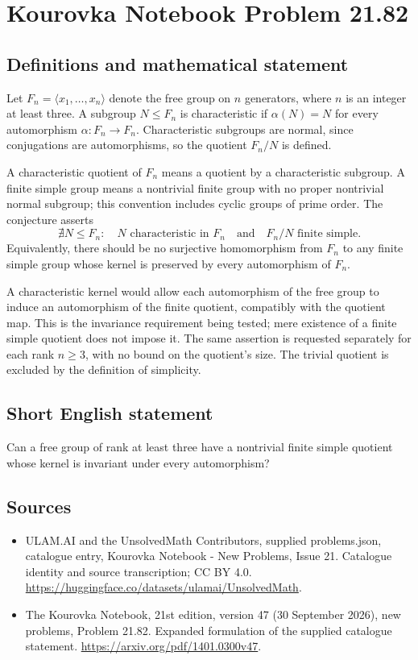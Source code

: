\documentclass[11pt,a4paper]{article}
\begin{document}
\section*{Kourovka Notebook Problem 21.82}\label{statement}

\subsection{Definitions and mathematical statement}
Let $F_n=\langle x_1,\ldots,x_n\rangle$ denote the free group on $n$ generators, where $n$ is an integer at least three. A subgroup $N\le F_n$ is characteristic if $\alpha(N)=N$ for every automorphism $\alpha:F_n\to F_n$. Characteristic subgroups are normal, since conjugations are automorphisms, so the quotient $F_n/N$ is defined.

A characteristic quotient of $F_n$ means a quotient by a characteristic subgroup. A finite simple group means a nontrivial finite group with no proper nontrivial normal subgroup; this convention includes cyclic groups of prime order. The conjecture asserts
\[
 \nexists N\le F_n:\quad
 N\text{ characteristic in }F_n
 \quad\text{and}\quad F_n/N\text{ finite simple}.
\]
Equivalently, there should be no surjective homomorphism from $F_n$ to any finite simple group whose kernel is preserved by every automorphism of $F_n$.

A characteristic kernel would allow each automorphism of the free group to induce an automorphism of the finite quotient, compatibly with the quotient map. This is the invariance requirement being tested; mere existence of a finite simple quotient does not impose it. The same assertion is requested separately for each rank $n\ge3$, with no bound on the quotient's size. The trivial quotient is excluded by the definition of simplicity.
\subsection{Short English statement}
Can a free group of rank at least three have a nontrivial finite simple quotient whose kernel is invariant under every automorphism?
\subsection{Sources}
\begin{itemize}
\item[S1] ULAM.AI and the UnsolvedMath Contributors, supplied problems.json, catalogue entry, Kourovka Notebook - New Problems, Issue 21. Catalogue identity and source transcription; CC BY 4.0.
\url{https://huggingface.co/datasets/ulamai/UnsolvedMath}.
\item[S2] The Kourovka Notebook, 21st edition, version 47 (30 September 2026), new problems, Problem 21.82. Expanded formulation of the supplied catalogue statement.
\url{https://arxiv.org/pdf/1401.0300v47}.
\end{itemize}
\end{document}
